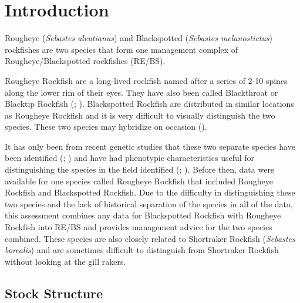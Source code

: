 \documentclass[
]{scrartcl}
\begin{document}
\endgroup

\newpage{}

\setlength{\parskip}{5mm plus1mm minus1mm}
\setcounter{page}{1}
\setcounter{section}{0}
\renewcommand{\thefigure}{\arabic{figure}}
\setcounter{figure}{0}
\renewcommand{\thetable}{\arabic{table}}
\setcounter{table}{-1}

\section{Introduction}\label{introduction}

Rougheye (\emph{Sebastes aleutianus}) and Blackspotted (\emph{Sebastes
melanostictus}) rockfishes are two species that form one management
complex of Rougheye/Blackspotted rockfishes (RE/BS).

Rougheye Rockfish are a long-lived rockfish named after a series of 2-10
spines along the lower rim of their eyes. They have also been called
Blackthroat or Blacktip Rockfish
(; ). Blackspotted
Rockfish are distributed in similar locations as Rougheye Rockfish and
it is very difficult to visually distinguish the two species. These two
species may hybridize on occasion
().

It has only been from recent genetic studies that these two separate
species have been identified
(;
) and have
had phenotypic characteristics useful for distinguishing the species in
the field identified (; ). Before then, data were available for one species called Rougheye
Rockfish that included Rougheye Rockfish and Blackspotted Rockfish. Due
to the difficulty in distinguishing these two species and the lack of
historical separation of the species in all of the data, this assessment
combines any data for Blackspotted Rockfish with Rougheye Rockfish into
RE/BS and provides management advice for the two species combined. These
species are also closely related to Shortraker Rockfish (\emph{Sebastes
borealis}) and are sometimes difficult to distinguish from Shortraker
Rockfish without looking at the gill rakers.

\subsection{Stock Structure}\label{sec-stock_structure}
\end{document}
